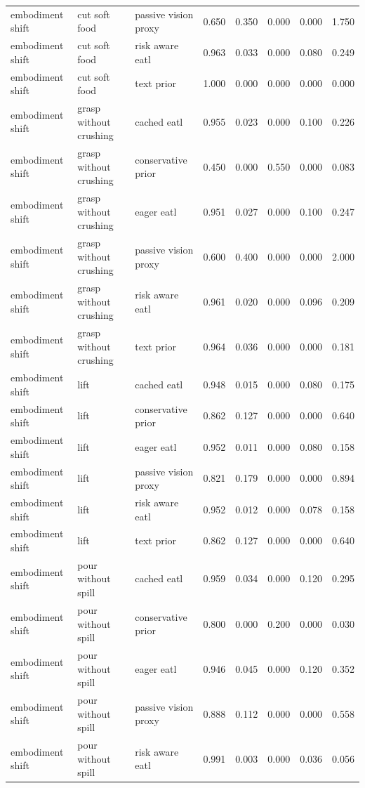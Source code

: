 \begin{longtable}{lllrrrrr}
embodiment shift & cut soft food & passive vision proxy & 0.650 & 0.350 & 0.000 & 0.000 & 1.750 \\
embodiment shift & cut soft food & risk aware eatl & 0.963 & 0.033 & 0.000 & 0.080 & 0.249 \\
embodiment shift & cut soft food & text prior & 1.000 & 0.000 & 0.000 & 0.000 & 0.000 \\
\midrule
embodiment shift & grasp without crushing & cached eatl & 0.955 & 0.023 & 0.000 & 0.100 & 0.226 \\
embodiment shift & grasp without crushing & conservative prior & 0.450 & 0.000 & 0.550 & 0.000 & 0.083 \\
embodiment shift & grasp without crushing & eager eatl & 0.951 & 0.027 & 0.000 & 0.100 & 0.247 \\
embodiment shift & grasp without crushing & passive vision proxy & 0.600 & 0.400 & 0.000 & 0.000 & 2.000 \\
embodiment shift & grasp without crushing & risk aware eatl & 0.961 & 0.020 & 0.000 & 0.096 & 0.209 \\
embodiment shift & grasp without crushing & text prior & 0.964 & 0.036 & 0.000 & 0.000 & 0.181 \\
\midrule
embodiment shift & lift & cached eatl & 0.948 & 0.015 & 0.000 & 0.080 & 0.175 \\
embodiment shift & lift & conservative prior & 0.862 & 0.127 & 0.000 & 0.000 & 0.640 \\
embodiment shift & lift & eager eatl & 0.952 & 0.011 & 0.000 & 0.080 & 0.158 \\
embodiment shift & lift & passive vision proxy & 0.821 & 0.179 & 0.000 & 0.000 & 0.894 \\
embodiment shift & lift & risk aware eatl & 0.952 & 0.012 & 0.000 & 0.078 & 0.158 \\
embodiment shift & lift & text prior & 0.862 & 0.127 & 0.000 & 0.000 & 0.640 \\
\midrule
embodiment shift & pour without spill & cached eatl & 0.959 & 0.034 & 0.000 & 0.120 & 0.295 \\
embodiment shift & pour without spill & conservative prior & 0.800 & 0.000 & 0.200 & 0.000 & 0.030 \\
embodiment shift & pour without spill & eager eatl & 0.946 & 0.045 & 0.000 & 0.120 & 0.352 \\
embodiment shift & pour without spill & passive vision proxy & 0.888 & 0.112 & 0.000 & 0.000 & 0.558 \\
embodiment shift & pour without spill & risk aware eatl & 0.991 & 0.003 & 0.000 & 0.036 & 0.056 \\

\end{longtable}
